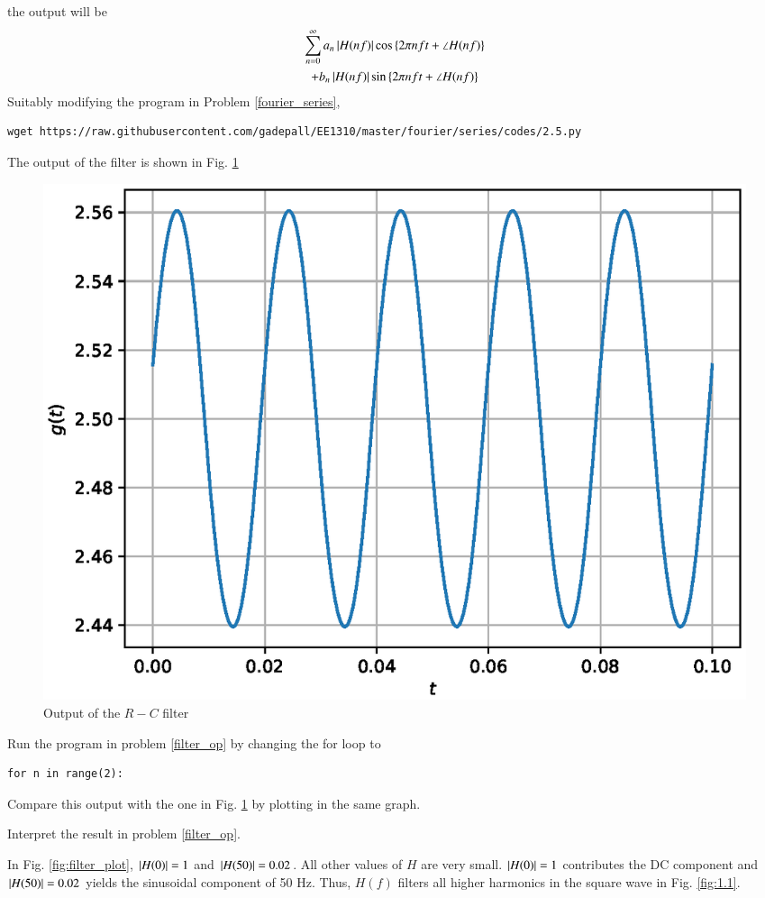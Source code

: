 \documentclass[journal,12pt,twocolumn]{IEEEtran}
\begin{document}
%
the output will be
%
%
\begin{multline}
\sum_{n=0}^{\infty}a_n\left\vert H(nf)\right\vert\cos\left\{2\pi n f t + \angle H(nf)\right\} 
\\
+ b_n \left\vert H(nf)\right\vert\sin\left\{2\pi n f t + \angle H(nf)\right\}
\end{multline}
%
Suitably modifying the program in Problem \ref{fourier_series},
%
\begin{lstlisting}
wget https://raw.githubusercontent.com/gadepall/EE1310/master/fourier/series/codes/2.5.py
\end{lstlisting}
%
%
The output of the filter is shown  in Fig. \ref{fig:2.5}
\begin{figure}[!h]
\centering
\includegraphics[width=\columnwidth]{./figs/2.5.eps}
\caption{Output of the $R-C$ filter}
\label{fig:2.5}
\end{figure}
%
\begin{problem}
Run the program in problem \ref{filter_op} by changing the for loop to
\begin{verbatim}
for n in range(2):
\end{verbatim}
Compare this output with the one in Fig. \ref{fig:2.5} by plotting in the same graph.
\end{problem}
\begin{problem}
Interpret the result in problem \ref{filter_op}.
\end{problem}
%
\solution
In Fig. \ref{fig:filter_plot}, $\left\vert H(0)\right\vert = 1$ and $\left\vert H(50)\right\vert = 0.02$.  All other values of $H$ are very small.  $\left\vert H(0)\right\vert = 1$ contributes the DC component and $\left\vert H(50)\right\vert = 0.02$ yields the sinusoidal component of 50 Hz.  Thus, $H(f)$ filters all higher harmonics in the square wave in Fig. \ref{fig:1.1}.
%
\end{document}
